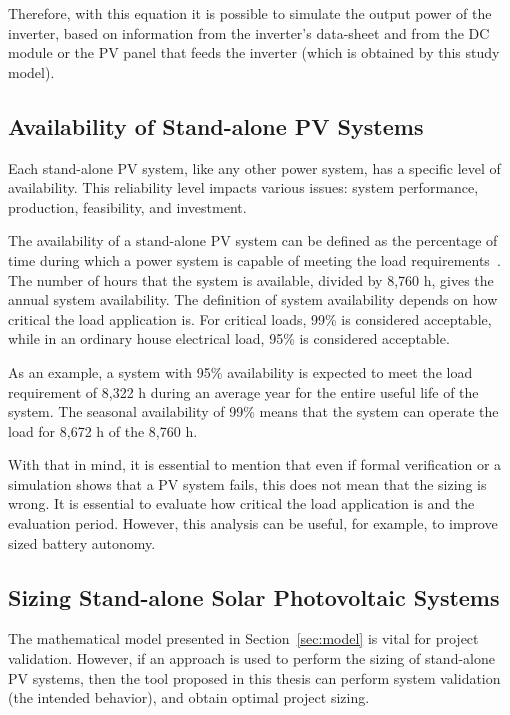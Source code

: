 Therefore, with this equation it is possible to simulate the output power of the inverter, based on information from the inverter's data-sheet and from the DC module or the PV panel that feeds the inverter (which is obtained by this study model).

\subsection{Availability of Stand-alone PV Systems}
\label{sec:availability}

Each stand-alone PV system, like any other power system, has a specific level of availability. This reliability level impacts various issues: system performance, production, feasibility, and investment. 

The availability of a stand-alone PV system can be defined as the percentage of time during which a power system is capable of meeting the load requirements~\cite{Khatib2014}. The number of hours that the system is available, divided by 8,760 h, gives the annual system availability.
The definition of system availability depends on how critical the load application is. For critical loads, 99\% is considered acceptable, while in an ordinary house electrical load, 95\% is considered acceptable. 

As an example, a system with 95\% availability is expected to meet the load requirement of 8,322 h during an average year for the entire useful life of the system. The seasonal availability of 99\% means that the system can operate the load for 8,672 h of the 8,760 h.

With that in mind, it is essential to mention that even if formal verification or a simulation shows that a PV system fails, this does not mean that the sizing is wrong. It is essential to evaluate how critical the load application is and the evaluation period. However, this analysis can be useful, for example, to improve sized battery autonomy.

\subsection{Sizing Stand-alone Solar Photovoltaic Systems}
\label{sec:sizing}

The mathematical model presented in Section~\ref{sec:model} is vital for project validation. However, if an approach is used to perform the sizing of stand-alone PV systems, then the tool proposed in this thesis can perform system validation (the intended behavior), and obtain optimal project sizing.


